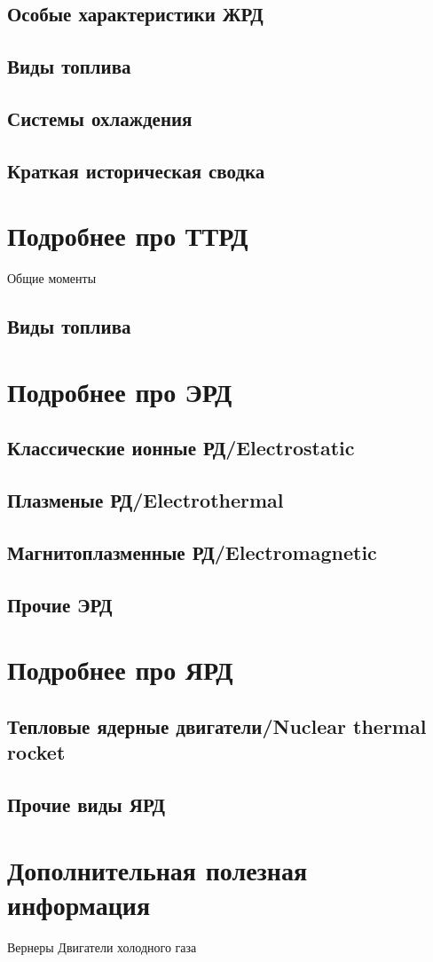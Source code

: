 \documentclass{article}
\begin{document}
\subsection{Особые характеристики ЖРД}

\subsection{Виды топлива}

\subsection{Системы охлаждения}

\subsection{Краткая историческая сводка}


\section{Подробнее про ТТРД}
Общие моменты
\subsection{Виды топлива}

\section{Подробнее про ЭРД}

\subsection{Классические ионные РД/Electrostatic}

\subsection{Плазменые РД/Electrothermal}

\subsection{Магнитоплазменные РД/Electromagnetic}

\subsection{Прочие ЭРД}


\section{Подробнее про ЯРД}

\subsection{Тепловые ядерные двигатели/Nuclear thermal rocket}

\subsection{Прочие виды ЯРД}


\section{Дополнительная полезная информация}
Вернеры
Двигатели холодного газа
\end{document}
